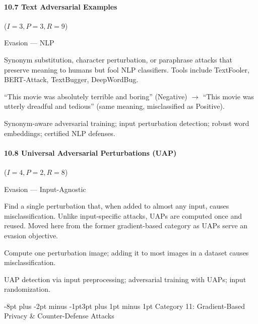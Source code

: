 \documentclass[conference]{IEEEtran}
\makeatletter
\renewcommand{\subsection}{\@startsection{subsection}{2}{\z@}%
  {-8pt plus -2pt minus -1pt}{3pt plus 1pt minus 1pt}%
  {\normalfont\normalsize\bfseries\sffamily\color{accentblue}}}
\newenvironment{attackentry}{\begin{description}[style=unboxed,leftmargin=0cm,itemsep=1pt,parsep=1pt,topsep=2pt,font=\sffamily\small\color{accentdark}]}{\end{description}}
\makeatother
\begin{document}
\paragraph{10.7 Text Adversarial Examples} ($I{=}3, P{=}3, R{=}9$)
\begin{attackentry}
\item[Category:] Evasion --- NLP
\item[How it works:] Synonym substitution, character perturbation, or paraphrase attacks that preserve meaning to humans but fool NLP classifiers. Tools include TextFooler, BERT-Attack, TextBugger, DeepWordBug.
\item[Example:] ``This movie was absolutely terrible and boring'' (Negative) $\rightarrow$ ``This movie was utterly dreadful and tedious'' (same meaning, misclassified as Positive).
\item[Mitigations:] Synonym-aware adversarial training; input perturbation detection; robust word embeddings; certified NLP defenses.
\end{attackentry}

\paragraph{10.8 Universal Adversarial Perturbations (UAP)} ($I{=}4, P{=}2, R{=}8$)
\begin{attackentry}
\item[Category:] Evasion --- Input-Agnostic
\item[How it works:] Find a single perturbation that, when added to almost any input, causes misclassification. Unlike input-specific attacks, UAPs are computed once and reused. Moved here from the former gradient-based category as UAPs serve an evasion objective.
\item[Example:] Compute one perturbation image; adding it to most images in a dataset causes misclassification.
\item[Mitigations:] UAP detection via input preprocessing; adversarial training with UAPs; input randomization.
\end{attackentry}

\subsection{Category 11: Gradient-Based Privacy \& Counter-Defense Attacks}
\end{document}
